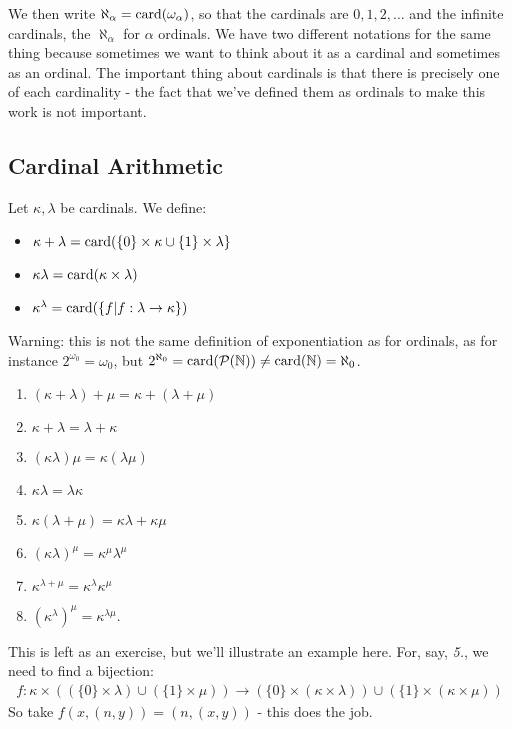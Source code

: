 \documentclass[10pt,a4paper]{article}
\begin{document}
We then write $\aleph_\alpha = \operatorname{card}(\omega_\alpha)$, so that the cardinals are $0,1,2,\ldots$ and the infinite cardinals, the $\aleph_\alpha$ for $\alpha$ ordinals. We have two different notations for the same thing because sometimes we want to think about it as a cardinal and sometimes as an ordinal. The important thing about cardinals is that there is precisely one of each cardinality - the fact that we've defined them as ordinals to make this work is not important.

\subsection{Cardinal Arithmetic}
Let $\kappa, \lambda$ be cardinals. We define:
\begin{itemize}
\item $\kappa + \lambda = \operatorname{card}(\{0\}\times \kappa \cup \{1\}\times \lambda\}$
\item $\kappa\lambda = \operatorname{card}(\kappa\times \lambda)$
\item $\kappa^{\lambda} = \operatorname{card}(\{f| f:\lambda\to\kappa\})$
\end{itemize}
Warning: this is not the same definition of exponentiation as for ordinals, as for instance $2^{\omega_0} = \omega_0$, but $2^{\aleph_0} = \operatorname{card}(\mathcal{P}(\mathbb{N})) \neq \operatorname{card}(\mathbb{N}) = \aleph_0$.

\begin{proposition}
\item
\begin{enumerate}
\item $(\kappa + \lambda) + \mu = \kappa + (\lambda + \mu)$
\item $\kappa + \lambda = \lambda + \kappa$
\item $(\kappa\lambda)\mu = \kappa(\lambda\mu)$
\item $\kappa\lambda = \lambda\kappa$
\item $\kappa(\lambda+\mu) = \kappa\lambda + \kappa\mu$
\item $(\kappa\lambda)^\mu = \kappa^\mu\lambda^\mu$
\item $\kappa^{\lambda + \mu} = \kappa^{\lambda}\kappa^\mu$
\item $(\kappa^\lambda)^\mu = \kappa^{\lambda\mu}$.
\end{enumerate}
\end{proposition}
This is left as an exercise, but we'll illustrate an example here. For, say, \textit{5.}, we need to find a bijection:
\begin{align*}
f:\kappa\times\left((\{0\}\times\lambda)\cup(\{1\}\times \mu)\right) \to \left(\{0\}\times(\kappa\times\lambda)\right)\cup\left(\{1\}\times(\kappa\times\mu)\right)
\end{align*}
So take $f(x,(n,y)) = (n,(x,y))$ - this does the job.
\end{document}
